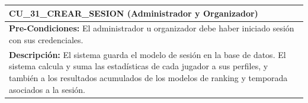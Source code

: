 \begin{center}
  \begin{tabular}{| p{7.5cm} | p{7.5cm} |}
    \hline
    \multicolumn{2}{|p{15cm}|}{\textbf{CU\_31\_CREAR\_SESION} (Administrador y Organizador)} \\ \hline
    \multicolumn{2}{|p{15cm}|}{\textbf{Pre-Condiciones:} El administrador u organizador debe haber iniciado sesión con sus credenciales.} \\ \hline
    \multicolumn{2}{|p{15cm}|}{\textbf{Descripción:} El sistema guarda el modelo de sesión en la base de datos. El sistema calcula y suma las estadísticas de cada jugador a sus perfiles, y también a los resultados acumulados de los modelos de ranking y temporada asociados a la sesión.} \\
    \hline
  \end{tabular}
  
  \label{table:usecase:31}
\end{center}

